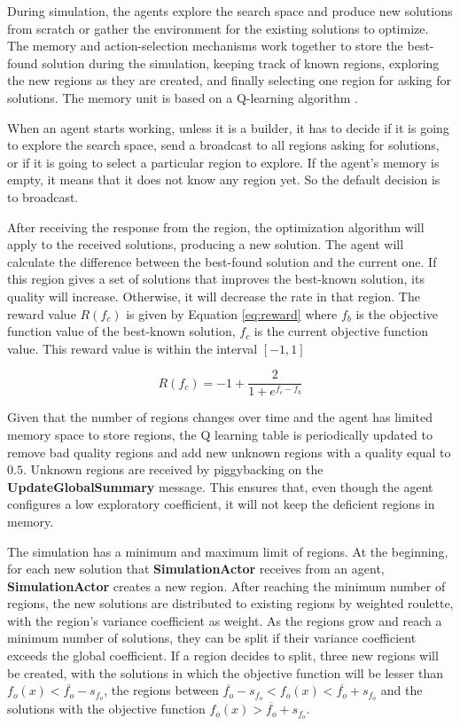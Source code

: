 \documentclass[preprint,12pt]{elsarticle}
\begin{document}
During simulation, the agents explore the search space and produce new solutions from scratch or gather the environment for the existing solutions to optimize. The memory and action-selection mechanisms work together to store the best-found solution during the simulation, keeping track of known regions, exploring the new regions as they are created, and finally selecting one region for asking for solutions. The memory unit is based on a Q-learning algorithm \cite{hasselt2010qlearning}.

When an agent starts working, unless it is a builder, it has to decide if it is going to explore the search space, send a broadcast to all regions asking for solutions, or if it is going to select a particular region to explore. If the agent's memory is empty, it means that it does not know any region yet. So the default decision is to broadcast. 

After receiving the response from the region, the optimization algorithm will apply to the received solutions, producing a new solution. The agent will calculate the difference between the best-found solution and the current one. If this region gives a set of solutions that improves the best-known solution, its quality will increase. Otherwise, it will decrease the rate in that region. The reward value $R(f_c)$ is given by Equation \ref{eq:reward} where $f_b$ is the objective function value of the best-known solution, $f_c$ is the current objective function value. This reward value is within the interval $[-1, 1]$

\begin{equation}
\label{eq:reward}
    R(f_c) = -1 + \frac{2}{1 + e^{f_c - f_b}}
\end{equation}

Given that the number of regions changes over time and the agent has limited memory space to store regions, the Q learning table is periodically updated to remove bad quality regions and add new unknown regions with a quality equal to $0.5$. Unknown regions are received by piggybacking on the \textbf{UpdateGlobalSummary} message. This ensures that, even though the agent configures a low exploratory coefficient, it will not keep the deficient regions in memory.

The simulation has a minimum and maximum limit of regions. At the beginning, for each new solution that \textbf{SimulationActor} receives from an agent, \textbf{ SimulationActor } creates a new region. After reaching the minimum number of regions, the new solutions are distributed to existing regions by weighted roulette, with the region's variance coefficient as weight. As the regions grow and reach a minimum number of solutions, they can be split if their variance coefficient exceeds the global coefficient. If a region decides to split, three new regions will be created, with the solutions in which the objective function will be lesser than $f_o(x) < \overline{f_o} - s_{f_o}$, the regions between $\overline{f_o} - s_{f_o} < f_o(x) < \overline{f_o} + s_{f_o}$  and the solutions with the objective function $f_o(x) > \overline{f_o} + s_{f_o}$.
\end{document}
